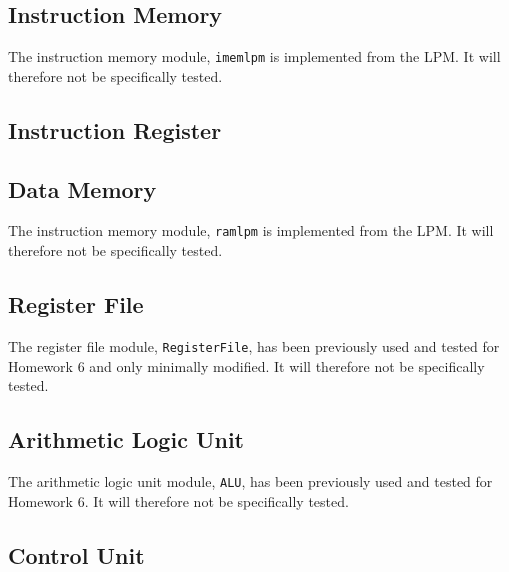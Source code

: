 
\subsection{Instruction Memory} %
\label{sub:instruction_memory}

The instruction memory module, \verb|imemlpm| is implemented from the LPM.
It will therefore not be specifically tested.


\subsection{Instruction Register} %
\label{sub:instruction_register}


\subsection{Data Memory} %
\label{sub:data_memory}

The instruction memory module, \verb|ramlpm| is implemented from the LPM.
It will therefore not be specifically tested.

\subsection{Register File} %
\label{sub:register_file}

The register file module, \verb|RegisterFile|, has been previously used and tested for Homework 6
and only minimally modified.
It will therefore not be specifically tested.

\subsection{Arithmetic Logic Unit} %
\label{sub:arithmetic_logic_unit}

The arithmetic logic unit module, \verb|ALU|, has been previously used and tested for Homework 6.
It will therefore not be specifically tested.

\subsection{Control Unit} %
\label{sub:control_unit}

